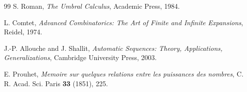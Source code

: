 \documentclass[11pt,oneside]{article}
\theoremstyle{definition}
\theoremstyle{remark}
\begin{document}
\begin{thebibliography}{99}
S. Roman,
\emph{The Umbral Calculus},
Academic Press, 1984.

L. Comtet,
\emph{Advanced Combinatorics: The Art of Finite and Infinite Expansions},
Reidel, 1974.

J.-P. Allouche and J. Shallit,
\emph{Automatic Sequences: Theory, Applications, Generalizations},
Cambridge University Press, 2003.

E. Prouhet,
\emph{Memoire sur quelques relations entre les puissances des nombres},
C. R. Acad. Sci. Paris \textbf{33} (1851), 225.

\end{thebibliography}
\end{document}
